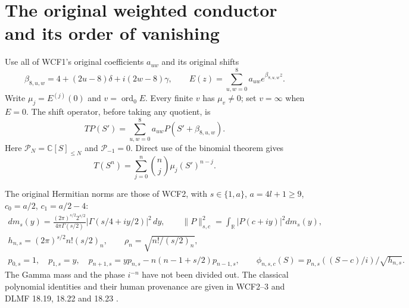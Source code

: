\documentclass[11pt]{article}
\newcommand{\C}{\mathbb C}
\newcommand{\cP}{\mathcal P}
\begin{document}
\section{The original weighted conductor and its order of vanishing}
Use all of WCF1's original coefficients $a_{uw}$ and its original shifts
\[
 \beta_{8,u,w}=4+(2u-8)\delta+i(2w-8)\gamma,
 \qquad
 E(z)=\sum_{u,w=0}^8a_{uw}e^{\beta_{8,u,w}z}.
\]
Write $\mu_j=E^{(j)}(0)$ and $v=\operatorname{ord}_0E$.
Every finite $v$ has $\mu_v\ne0$; set $v=\infty$ when $E=0$.
The shift operator, before taking any quotient, is
\begin{equation}
 TP(S')=\sum_{u,w=0}^8a_{uw}P(S'+\beta_{8,u,w}).\tag{FC4}
\end{equation}
Here $\cP_N=\C[S]_{\le N}$ and $\cP_{-1}=0$. Direct use of the
binomial theorem gives
\begin{equation}
 T(S^n)=\sum_{j=0}^n\binom nj\mu_j(S')^{n-j}.\tag{FC5}
\end{equation}

The original Hermitian norms are those of WCF2, with
$s\in\{1,a\}$, $a=4l+1\ge9$, $c_0=a/2$, $c_1=a/2-4$:
\begin{gather*}
 dm_s(y)=\frac{(2\pi)^{s/2}2^{s/2}}{4\pi\Gamma(s/2)}
 |\Gamma(s/4+iy/2)|^2\,dy,\qquad
 \|P\|_{s,c}^2=\int_{\mathbb R}|P(c+iy)|^2dm_s(y),\\
 h_{n,s}=(2\pi)^{s/2}n!(s/2)_n,\qquad
 \rho_n=\sqrt{n!/(s/2)_n},\\
 p_{0,s}=1,\quad p_{1,s}=y,\quad
 p_{n+1,s}=yp_{n,s}-n(n-1+s/2)p_{n-1,s},\qquad
 \phi_{n,s,c}(S)=p_{n,s}((S-c)/i)/\sqrt{h_{n,s}}.
\end{gather*}
The Gamma mass and the phase $i^{-n}$ have not been divided out.
The classical polynomial identities and their human provenance are
given in WCF2--3 and DLMF 18.19, 18.22 and 18.23 \cite{DLMF}.
\end{document}
